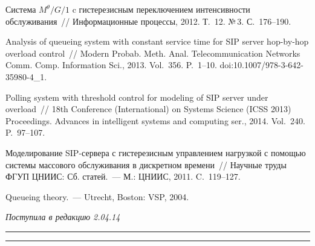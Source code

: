 \begin{multicols}{2}
{{\begin{thebibliography}{99}
Система $M^\theta/G/1$ c гистерезисным переключением интенсивности обслуживания~//
Информационные процессы, 2012. Т.~12. №\,3. С.~176--190.



Analysis of queueing system with constant service
time for SIP server hop-by-hop overload control~//
Modern Probab. Meth. Anal. Telecommunication Networks
Comm. Comp. Information Sci., 2013. Vol.~356.
P.~1--10. doi:10.1007/978-3-642-35980-4\_1.

 Polling
system with threshold control for modeling of SIP server under
overload~// 18th Conference (International) on Systems Science (ICSS
2013) Proceedings. Advances in intelligent systems and computing
ser., 2014. Vol.~240. P.~97--107.



Моделирование SIP-сер\-ве\-ра с гистерезисным управлением нагрузкой с помощью системы
массового обслуживания в дискретном времени~//
Научные труды ФГУП ЦНИИС: Сб. статей.~--- М.: ЦНИИС, 2011. C.~119--127.

Queueing theory.~--- Utrecht, Boston: VSP, 2004.


\end{thebibliography}
} }

\end{multicols}

\vspace*{-6pt}

\hfill{\small\textit{Поступила в редакцию 2.04.14}}



\vspace*{6pt}

\hrule

\vspace*{2pt}

\hrule

\vspace*{-2pt}


\def\tit{PERFORMANCE CHARACTERISTICS OF~Geo/Geo/1/$R$
QUEUE WITH~HYSTERETIC LOAD CONTROL}

\def\titkol{Performance characteristics of~Geo/Geo/1/$R$
queue with hysteretic load control}

